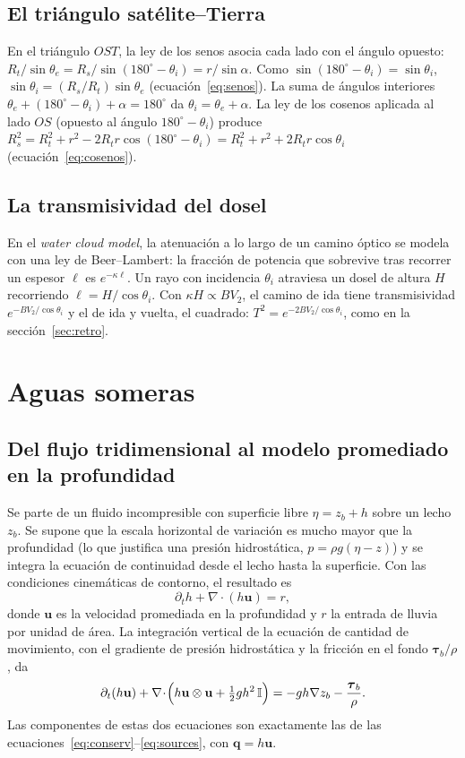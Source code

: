 \documentclass[11pt,a4paper]{article}
\begin{document}
\subsection{El triángulo satélite--Tierra}

En el triángulo $OST$, la ley de los senos asocia cada lado con el ángulo opuesto:
$R_t/\sin\theta_e=R_s/\sin(180^\circ-\theta_i)=r/\sin\alpha$. Como $\sin(180^\circ-\theta_i)=\sin\theta_i$,
$\sin\theta_i=(R_s/R_t)\sin\theta_e$ (ecuación~\eqref{eq:senos}). La suma de ángulos interiores
$\theta_e+(180^\circ-\theta_i)+\alpha=180^\circ$ da $\theta_i=\theta_e+\alpha$. La ley de los cosenos aplicada al
lado $OS$ (opuesto al ángulo $180^\circ-\theta_i$) produce $R_s^2=R_t^2+r^2-2R_tr\cos(180^\circ-\theta_i)
=R_t^2+r^2+2R_tr\cos\theta_i$ (ecuación~\eqref{eq:cosenos}).

\subsection{La transmisividad del dosel}

En el \emph{water cloud model}, la atenuación a lo largo de un camino óptico se modela con una ley de
Beer--Lambert: la fracción de potencia que sobrevive tras recorrer un espesor $\ell$ es $e^{-\kappa\ell}$.
Un rayo con incidencia $\theta_i$ atraviesa un dosel de altura $H$ recorriendo $\ell=H/\cos\theta_i$. Con
$\kappa H\propto BV_2$, el camino de ida tiene transmisividad $e^{-BV_2/\cos\theta_i}$ y el de ida y vuelta, el
cuadrado: $T^2=e^{-2BV_2/\cos\theta_i}$, como en la sección~\ref{sec:retro}.

\section{Aguas someras}
\label{sec:der-swe}

\subsection{Del flujo tridimensional al modelo promediado en la profundidad}

Se parte de un fluido incompresible con superficie libre $\eta=z_b+h$ sobre un lecho $z_b$. Se supone que la
escala horizontal de variación es mucho mayor que la profundidad (lo que justifica una presión hidrostática,
$p=\rho g(\eta-z)$) y se integra la ecuación de continuidad desde el lecho hasta la superficie. Con las
condiciones cinemáticas de contorno, el resultado es
\[
  \partial_th+\nabla\!\cdot\!(h\mathbf u)=r,
\]
donde $\mathbf u$ es la velocidad promediada en la profundidad y $r$ la entrada de lluvia por unidad de área. La
integración vertical de la ecuación de cantidad de movimiento, con el gradiente de presión hidrostática y la
fricción en el fondo $\boldsymbol\tau_b/\rho$, da
\[
  \partial_t(h\mathbf u)+\nabla\!\cdot\!\Bigl(h\mathbf u\otimes\mathbf u+\tfrac12gh^2\,\mathbb{I}\Bigr)
  =-gh\nabla z_b-\frac{\boldsymbol\tau_b}{\rho}.
\]
Las componentes de estas dos ecuaciones son exactamente las de las
ecuaciones~\eqref{eq:conserv}--\eqref{eq:sources}, con $\mathbf q=h\mathbf u$.
\end{document}

